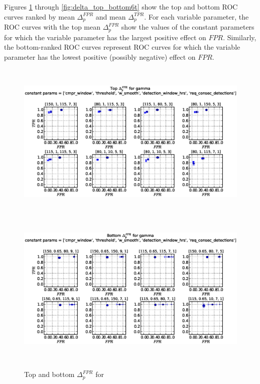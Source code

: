\clearpage
Figures \ref{fig:delta_top_bottom1f} through \ref{fig:delta_top_bottom6t} show the top
and bottom ROC curves ranked by mean $\Delta_p^{FPR}$ and mean
$\Delta_p^{TPR}$. For each variable parameter, the ROC curves with the top mean
$\Delta_p^{FPR}$ show the values of the constant parameters for which the
variable parameter has the largest positive effect on $FPR$. Similarly, the
bottom-ranked ROC curves represent ROC curves for which the variable parameter
has the lowest positive (possibly negative) effect on $FPR$.

\begin{figure}[!h]
\begin{center}
\includegraphics[height=3in]{../fig/final/top_fpr/gamma}
\includegraphics[height=3in]{../fig/final/bottom_fpr/gamma}
\end{center}
\caption{\label{fig:delta_top_bottom1f} Top and bottom $\Delta_p^{FPR}$ for }
\end{figure}


